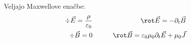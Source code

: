 
Veljajo Maxwellove enačbe:
\begin{alignat*}{2}
  \div \vec{E} = \frac{\rho}{\varepsilon_0} & \qquad & \rot \vec{E} = -
													   \partial_t \vec{B} \\
  \div \vec{B} = 0 & & \rot \vec{B} = \varepsilon_0 \mu_0 \partial_t \vec{E} +
					   \mu_0 \vec{J}
\end{alignat*}

